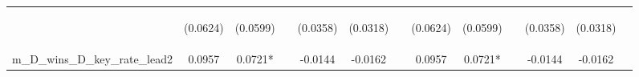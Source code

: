 \documentclass[]{article}
\begin{document}
\begin{center}
\begin{tabular}{lcccccccccccc}
\vspace{4pt} & \begin{footnotesize}(0.0624)\end{footnotesize} & \begin{footnotesize}(0.0599)\end{footnotesize} & \begin{footnotesize}\end{footnotesize} & \begin{footnotesize}(0.0358)\end{footnotesize} & \begin{footnotesize}(0.0318)\end{footnotesize} & \begin{footnotesize}\end{footnotesize} & \begin{footnotesize}(0.0624)\end{footnotesize} & \begin{footnotesize}(0.0599)\end{footnotesize} & \begin{footnotesize}\end{footnotesize} & \begin{footnotesize}(0.0358)\end{footnotesize} & \begin{footnotesize}(0.0318)\end{footnotesize} & \begin{footnotesize}\end{footnotesize} \\
m\_D\_wins\_D\_key\_rate\_lead2 & 0.0957 & 0.0721* &  & -0.0144 & -0.0162 &  & 0.0957 & 0.0721* &  & -0.0144 & -0.0162 &  \\

\end{tabular}
\end{center}
\end{document}
